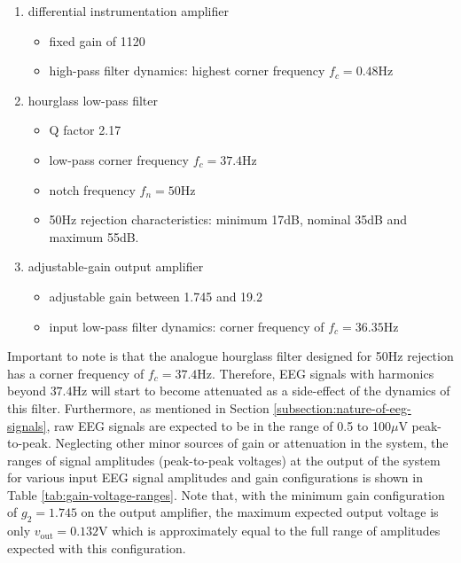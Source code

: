 \begin{enumerate}[label=(\alph*)] %
\item differential instrumentation amplifier
\begin{itemize}
    \item fixed gain of 1120
    \item high-pass filter dynamics: highest corner frequency $f_c=0.48$Hz
\end{itemize}
\item hourglass low-pass filter
\begin{itemize}
    \item Q factor 2.17
    \item low-pass corner frequency $f_c=37.4$Hz
    \item notch frequency $f_n=50$Hz
    \item 50Hz rejection characteristics: minimum 17dB, nominal 35dB and maximum 55dB.
\end{itemize}

\item adjustable-gain output amplifier
\begin{itemize}
    \item adjustable gain between 1.745 and 19.2
    \item input low-pass filter dynamics: corner frequency of $f_c=36.35$Hz 
\end{itemize}
\end{enumerate}
Important to note is that the analogue hourglass filter designed for 50Hz rejection has a corner frequency of $f_c=37.4$Hz. Therefore, EEG signals with harmonics beyond $37.4$Hz will start to become attenuated as a side-effect of the dynamics of this filter. Furthermore, as mentioned in Section \ref{subsection:nature-of-eeg-signals}, raw EEG signals are expected to be in the range of 0.5 to 100$\mu$V peak-to-peak. Neglecting other minor sources of gain or attenuation in the system, the ranges of signal amplitudes (peak-to-peak voltages) at the output of the system for various input EEG signal amplitudes and gain configurations is shown in Table \ref{tab:gain-voltage-ranges}. Note that, with the minimum gain configuration of $g_2=1.745$ on the output amplifier, the maximum expected output voltage is only $v_{\textrm{out}}=0.132$V which is approximately equal to the full range of amplitudes expected with this configuration.

